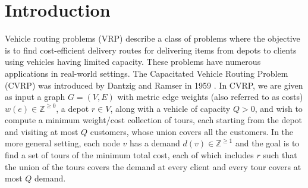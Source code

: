 \documentclass[twoside,leqno]{article}
\begin{document}
\section{Introduction}
Vehicle routing problems (VRP) describe a class of problems where the objective is to find cost-efficient delivery routes for delivering items from depots to clients using vehicles having limited capacity. These problems have numerous applications in real-world settings. The Capacitated Vehicle Routing Problem (CVRP) was introduced by Dantzig and Ramser in 1959 \cite{Dantzig}. In CVRP, we are given as input a graph $G=(V,E)$ with
metric edge weights (also referred to as costs) $w(e)\in\mathbb{Z}^{\ge 0}$,
a depot $r\in V$, along with a vehicle of capacity $Q>0$, and wish to compute a minimum weight/cost collection of tours, each starting from the depot and visiting at most $Q$ customers, whose union covers all the customers. In the more general setting, each node $v$ has a demand $d(v)\in \mathbb{Z}^{\ge 1}$ and the goal is to find a set of tours of the minimum total cost, each of which includes $r$ such that the union of the tours covers the demand at every client and every tour covers at most $Q$ demand.
\end{document}
